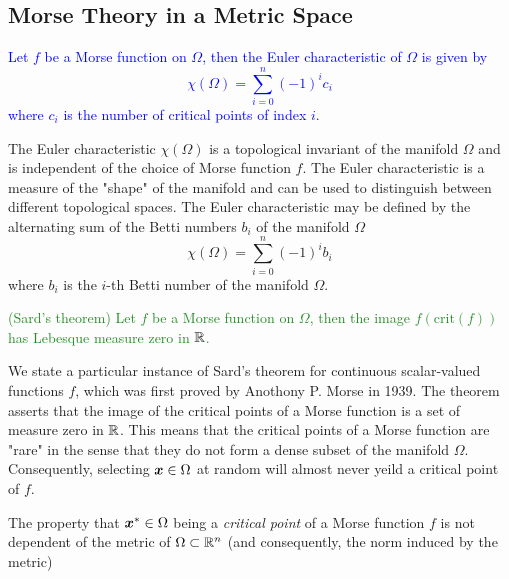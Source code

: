 \documentclass[10pt]{article}
\begin{document}
\subsection{Morse Theory in a Metric Space}

\begin{theorem}
    \textcolor{Blue}{
        Let $f$ be a Morse function on $\Omega$, then the Euler characteristic of $\Omega$ is
        given by
        $$
            \chi(\Omega) = \sum_{i=0}^n (-1)^i c_i
        $$
        where $c_i$ is the number of critical points of index $i$.
    }
\end{theorem}

\begin{remark}
    The Euler characteristic $\chi(\Omega)$ is a topological invariant of the manifold $\Omega$
    and is independent of the choice of Morse function $f$.
    The Euler characteristic is a measure of the "shape" of the manifold and can be used to
    distinguish between different topological spaces.
    The Euler characteristic may be defined by the alternating sum of the Betti numbers
    $b_i$ of the manifold $\Omega$
    $$
        \chi(\Omega) = \sum_{i=0}^n (-1)^i b_i
    $$
    where $b_i$ is the $i$-th Betti number of the manifold $\Omega$.
\end{remark}

\begin{theorem}
    \textcolor{ForestGreen}{
        (Sard's theorem) Let $f$ be a Morse function on $\Omega$, then
        the image $f(\text{crit}(f))$ has Lebesque measure zero in $\mathbb{R}$.
    }
\end{theorem}

\begin{remark}
    We state a particular instance of Sard's theorem for continuous scalar-valued functions $f$,
    which was first proved by Anothony P. Morse in 1939.
    The theorem asserts that the image of the critical points of a Morse function is a set 
    of measure zero in $\mathbb{R}$. This means that the critical points of a Morse function are "rare" in the sense that they
    do not form a dense subset of the manifold $\Omega$.
    Consequently, selecting $\bm{x} \in \Omega$ at random will almost never yeild a critical
    point of $f$.
\end{remark}

\begin{remark}
    The property that $\bm{x}^* \in \Omega$ being a \emph{critical point} of a Morse function $f$ is
    not dependent of the metric of $\Omega \subset \mathbb{R}^n$ (and consequently, the norm induced by the metric)
\end{remark}
\end{document}
